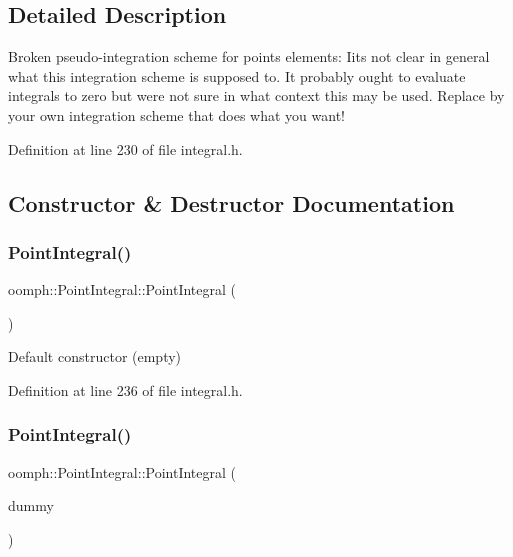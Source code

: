 \subsection{Detailed Description}
Broken pseudo-\/integration scheme for points elements\+: Iit\textquotesingle{}s not clear in general what this integration scheme is supposed to. It probably ought to evaluate integrals to zero but we\textquotesingle{}re not sure in what context this may be used. Replace by your own integration scheme that does what you want! 

Definition at line 230 of file integral.\+h.



\subsection{Constructor \& Destructor Documentation}
\mbox{\label{classoomph_1_1PointIntegral_aa8a362528e1277b2a4f01081f3b26a51}} 
\subsubsection{\texorpdfstring{Point\+Integral()}{PointIntegral()}\hspace{0.1cm}{\footnotesize\ttfamily [1/2]}}
{\footnotesize\ttfamily oomph\+::\+Point\+Integral\+::\+Point\+Integral (\begin{DoxyParamCaption}{ }\end{DoxyParamCaption})\hspace{0.3cm}{\ttfamily [inline]}}



Default constructor (empty) 



Definition at line 236 of file integral.\+h.

\mbox{\label{classoomph_1_1PointIntegral_a68ec55f1353da24494a66fa827192b1d}} 
\subsubsection{\texorpdfstring{Point\+Integral()}{PointIntegral()}\hspace{0.1cm}{\footnotesize\ttfamily [2/2]}}
{\footnotesize\ttfamily oomph\+::\+Point\+Integral\+::\+Point\+Integral (\begin{DoxyParamCaption}\item[{const \hyperlink{classoomph_1_1PointIntegral}{Point\+Integral} \&}]{dummy }\end{DoxyParamCaption})\hspace{0.3cm}{\ttfamily [inline]}}




